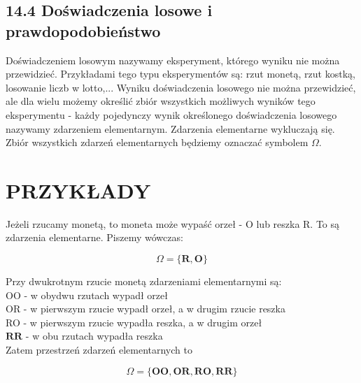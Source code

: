 \documentclass[10pt]{article}
\begin{document}
\subsection*{14.4 Doświadczenia losowe i prawdopodobieństwo}
Doświadczeniem losowym nazywamy eksperyment, którego wyniku nie można przewidzieć. Przykładami tego typu eksperymentów są: rzut monetą, rzut kostką, losowanie liczb w lotto,... Wyniku doświadczenia losowego nie można przewidzieć, ale dla wielu możemy określić zbiór wszystkich możliwych wyników tego eksperymentu - każdy pojedynczy wynik określonego doświadczenia losowego nazywamy zdarzeniem elementarnym. Zdarzenia elementarne wykluczają się. Zbiór wszystkich zdarzeń elementarnych będziemy oznaczać symbolem \(\Omega\).

\section*{PRZYKŁADY}
Jeżeli rzucamy monetą, to moneta może wypaść orzeł - O lub reszka R. To są zdarzenia elementarne. Piszemy wówczas:

\[
\Omega=\{\mathbf{R}, \mathbf{O}\}
\]

Przy dwukrotnym rzucie monetą zdarzeniami elementarnymi są:\\
OO - w obydwu rzutach wypadł orzeł\\
OR - w pierwszym rzucie wypadł orzeł, a w drugim rzucie reszka\\
RO - w pierwszym rzucie wypadła reszka, a w drugim orzeł\\
\(\mathbf{R R}\) - w obu rzutach wypadła reszka\\
Zatem przestrzeń zdarzeń elementarnych to

\[
\Omega=\{\mathbf{O O}, \mathbf{O R}, \mathbf{R O}, \mathbf{R R}\}
\]
\end{document}
